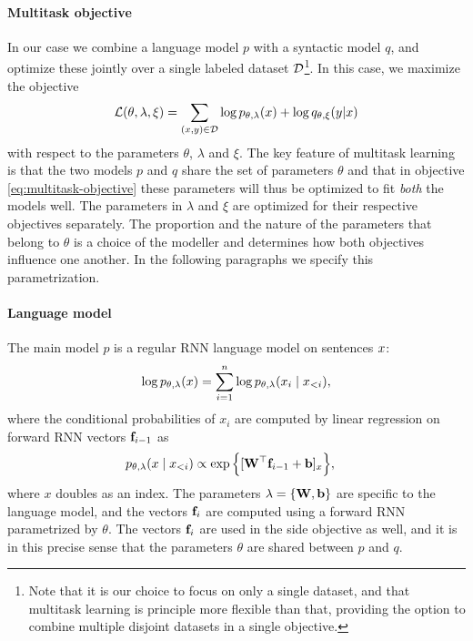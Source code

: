 \paragraph{Multitask objective}
In our case we combine a language model $p$ with a syntactic model $q$, and optimize these jointly over a single labeled dataset $\mathcal{D}$\footnote{Note that it is our choice to focus on only a single dataset, and that multitask learning is principle more flexible than that, providing the option to combine multiple disjoint datasets in a single objective.}. In this case, we maximize the objective
\begin{equation}
  \label{eq:multitask-objective}
  \mathcal{L}(\theta, \lambda, \xi) = \sum_{ (x, y) \in \mathcal{D} }\log p_{\theta, \lambda}(x) + \log q_{\theta,\xi}(y | x)
\end{equation}
with respect to the parameters $\theta$, $\lambda$ and $\xi$. The key feature of multitask learning is that the two models $p$ and $q$ share the set of parameters $\theta$ and that in objective \ref{eq:multitask-objective} these parameters will thus be optimized to fit \textit{both} the models well. The parameters in $\lambda$ and $\xi$ are optimized for their respective objectives separately. The proportion and the nature of the parameters that belong to $\theta$ is a choice of the modeller and determines how both objectives influence one another. In the following paragraphs we specify this parametrization.

\paragraph{Language model}
The main model $p$ is a regular RNN language model on sentences $x$:
\begin{align*}
  \log p_{\theta, \lambda}(x) = \sum_{i=1}^n \log p_{\theta, \lambda}(x_i \mid x_{<i}),
\end{align*}
where the conditional probabilities of $x_i$ are computed by linear regression on forward RNN vectors $\mathbf{f}_{i-1}$ as
\begin{align*}
  p_{\theta, \lambda}( x \mid x_{<i}) &\propto \exp \Big \{ [ \mathbf{W}^{\top} \mathbf{f}_{i-1} + \mathbf{b} ]_{x} \Big\},
\end{align*}
where $x$ doubles as an index. The parameters $\lambda = \{ \mathbf{W}, \mathbf{b} \}$ are specific to the language model, and the vectors $\mathbf{f}_i$ are computed using a forward RNN parametrized by $\theta$. The vectors $\mathbf{f}_i$ are used in the side objective as well, and it is in this precise sense that the parameters $\theta$ are shared between $p$ and $q$.


